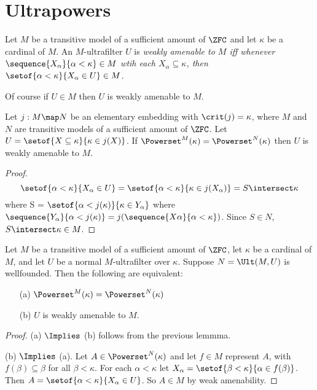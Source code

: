 \documentclass[oneside,12pt]{amsart}
\begin{document}

\section{Ultrapowers}

\begin{definition}
Let $M$ be a transitive model of a sufficient amount of $\ZFC$ and let $\kappa$ be
a cardinal of $M$. An $M$-ultrafilter $U$ is \em{weakly amenable} to $M$ iff whenever
$\sequence{X_{\alpha}}{\alpha<\kappa} \in M$ wtih each $X_{\alpha} \subseteq \kappa$,
then $\setof{\alpha < \kappa}{X_{\alpha} \in U} \in M$.
\end{definition}

Of course if $U\in M$ then $U$ is weakly amenable to $M$.

\begin{lemma}
Let $j:M \map N$ be an elementary embedding with $\crit(j)=\kappa$, where $M$ and $N$ are transitive models of a sufficient amount of $\ZFC$.
Let $U = \setof{X \subseteq \kappa}{\kappa \in j(X)}$. If
$\Powerset^{M}(\kappa) = \Powerset^{N}(\kappa)$ then $U$ is weakly amenable to $M$.
\end{lemma}
\begin{proof}
$$\setof{\alpha < \kappa}{X_{\alpha} \in U} =
\setof{\alpha < \kappa}{\kappa\in j(X_{\alpha})} =
S \intersect \kappa $$
where S = $\setof{\alpha < j(\kappa)}{\kappa\in Y_{\alpha}}$
where $\sequence{Y_{\alpha}}{\alpha<j(\kappa)} = j(\sequence{X{\alpha}}{\alpha<\kappa})$.
Since $S\in N$, $S \intersect \kappa \in M$.
\end{proof}

\begin{lemma}
\label{SameNextLevel}
Let $M$ be a transitive model of a sufficient amount of $\ZFC$, let $\kappa$ be
a cardinal of $M$, and let $U$ be a normal
 $M$-ultrafilter over $\kappa$. Suppose
$N = \Ult(M, U)$ is wellfounded. Then the following are equivalent:
\begin{itemize}
\item[(a)] $\Powerset^{M}(\kappa) = \Powerset^{N}(\kappa)$

\item[(b)] $U$ is weakly amenable to $M$.
\end{itemize}
\end{lemma}
\begin{proof}
(a) $\Implies$ (b) follows from the previous lemmma.

(b) $\Implies$ (a). Let $A\in\Powerset^{N}(\kappa)$  and let $f\in M$ represent
$A$, with $f(\beta) \subseteq \beta$ for all $\beta < \kappa$. For each $\alpha<\kappa$
let $X_{\alpha} = \setof{\beta < \kappa}{\alpha \in f(\beta)}$. Then
$A = \setof{\alpha<\kappa}{X_{\alpha} \in U}$. So $A\in M$ by weak amenability.
\end{proof}
\end{document}
